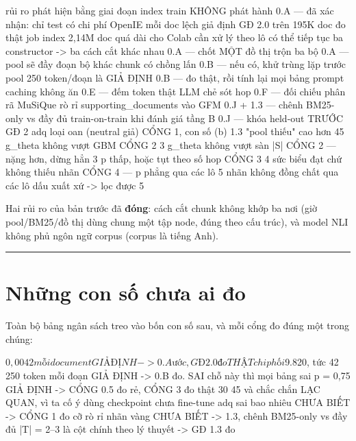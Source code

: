 \documentclass[11pt,a4paper]{article}
\begin{document}
\begin{dia}
rủi ro                                   phát hiện bằng                      giai đoạn
index train KHÔNG phát hành               0.A — đã xác nhận: chỉ test có
chi phí OpenIE mỗi doc lệch giả định     GĐ 2.0 trên 195K doc đo thật
job index 2,14M doc quá dài cho Colab    cần xử lý theo lô có thể tiếp tục
ba constructor -> ba cách cắt khác nhau  0.A — chốt MỘT
đồ thị trộn ba bộ                        0.A — pool sẽ đầy đoạn bộ khác
chunk có chồng lấn                       0.B — nếu có, khử trùng lặp trước pool
250 token/đoạn là GIẢ ĐỊNH               0.B — đo thật, rồi tính lại mọi bảng
prompt caching không ăn                  0.E — đếm token thật
LLM chẻ sót hop                          0.F — đối chiếu phân rã MuSiQue
rò rỉ supporting_documents vào GFM       0.J + 1.3 — chênh BM25-only vs đầy đủ
train-on-train khi đánh giá tầng B       0.J — khóa held-out TRƯỚC GĐ 2
adq loại oan (neutral giả)               CỔNG 1, con số (b)                  1.3
"pool thiếu" cao hơn 45%
g_theta không vượt GBM                       CỔNG 2                              3
g_theta không vượt sàn |S|                   CỔNG 2 — nặng hơn, dừng hẳn         3
p thấp, hoặc tụt theo số hop             CỔNG 3                              4
sức biểu đạt chứ không thiếu nhãn        CỔNG 4 — p phẳng qua các lô         5
nhãn không đồng chất qua các lô          dấu xuất xứ -> lọc được             5
\end{dia}

Hai rủi ro của bản trước đã \textbf{đóng}: cách cắt chunk không khớp ba nơi (giờ pool/BM25/đồ thị
dùng chung một tập node, đúng theo cấu trúc), và model NLI không phủ ngôn ngữ corpus (corpus
là tiếng Anh).

\vspace{0.3em}\hrule\vspace{0.6em}

\section{Những con số chưa ai đo}

Toàn bộ bảng ngân sách treo vào bốn con số sau, và mỗi cổng đo đúng một trong chúng:

\begin{dia}
$0,0042 mỗi document      GIẢ ĐỊNH          ->  0.A ước, GĐ 2.0 đo THẬT
                          chi phối $9.820, tức 42%
250 token mỗi đoạn        GIẢ ĐỊNH          ->  0.B đo.  SAI chỗ này thì mọi bảng sai
p = 0,75                  GIẢ ĐỊNH          ->  CỔNG 0.5 đo rẻ, CỔNG 3 đo thật
30%
45%
                          và chắc chắn LẠC QUAN, vì ta cố ý dùng
                          checkpoint chưa fine-tune
adq sai bao nhiêu         CHƯA BIẾT         ->  CỔNG 1 đo
cỡ rò rỉ nhãn vàng        CHƯA BIẾT         ->  1.3, chênh BM25-only vs đầy đủ
|T| = 2–3 là cột chính    theo lý thuyết    ->  GĐ 1.3 đo
\end{dia}
\end{document}
